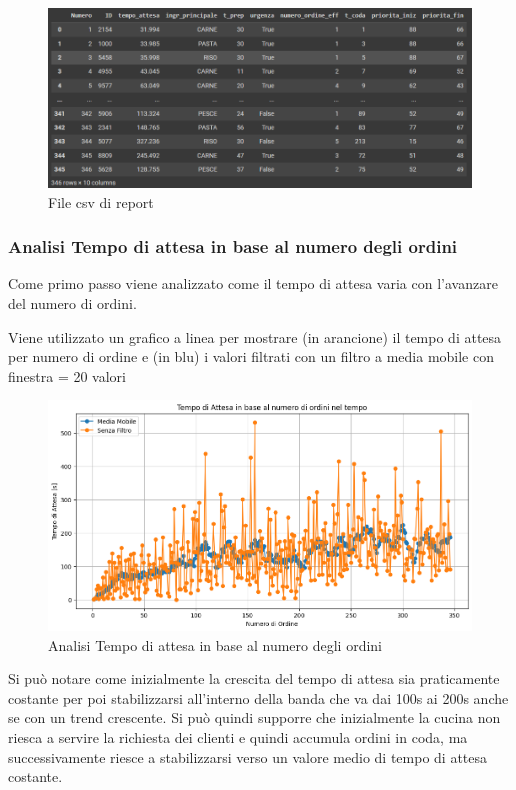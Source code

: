 \begin{figure}[H]
	\centering
	\includegraphics[scale=0.6]{iterazione3/images/datasetcsv.png}
	\caption{File csv di report\label{fig:report-csv}}
\end{figure}

\subsubsection{Analisi Tempo di attesa in base al numero degli ordini}
Come primo passo viene analizzato come il tempo di attesa varia con l'avanzare del numero di ordini.

Viene utilizzato un grafico a linea per mostrare (in arancione) il tempo di attesa per numero di ordine e (in blu) i valori filtrati con un filtro a media mobile con finestra = 20 valori

\begin{figure}[H]
	\centering
	\includegraphics[scale=0.6]{iterazione3/images/t_attesa_numero_ordini.png}
	\caption{Analisi Tempo di attesa in base al numero degli ordini\label{fig:lineplot}}
\end{figure}

Si può notare come inizialmente la crescita del tempo di attesa sia praticamente costante per poi stabilizzarsi all'interno della banda che va dai 100s ai 200s anche se con un trend crescente. Si può quindi supporre che inizialmente la cucina non riesca a servire la richiesta dei clienti e quindi accumula ordini in coda, ma successivamente riesce a stabilizzarsi verso un valore medio di tempo di attesa costante.

